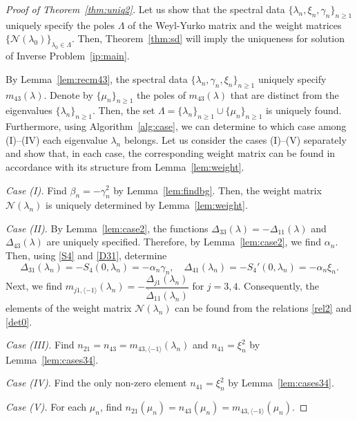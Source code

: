 \documentclass[a4paper,12pt]{article}
\newcommand{\al}{\alpha}
\newcommand{\be}{\beta}
\newcommand{\ga}{\gamma}
\newcommand{\la}{\lambda}
\theoremstyle{plain}
\numberwithin{equation}{section}
\theoremstyle{definition}
\theoremstyle{remark}
\begin{document}
\begin{proof}[Proof of Theorem~\ref{thm:uniq2}]
Let us show that the spectral data $\{ \la_n, \xi_n, \ga_n \}_{n \ge 1}$ uniquely specify the poles $\Lambda$ of the Weyl-Yurko matrix and the weight matrices $\{\mathcal N(\la_0) \}_{\la_0 \in \Lambda}$. Then, Theorem~\ref{thm:sd} will imply the uniqueness for solution of Inverse Problem~\ref{ip:main}.

By Lemma~\ref{lem:recm43}, the spectral data $\{ \la_n, \ga_n, \xi_n \}_{n \ge 1}$ uniquely specify $m_{43}(\la)$. Denote by $\{\mu_n \}_{n \ge 1}$ the poles of $m_{43}(\la)$ that are distinct from the eigenvalues $\{ \la_n \}_{n \ge 1}$. Then, the set $\Lambda = \{ \la_n \}_{n \ge 1} \cup \{ \mu_n \}_{n \ge 1}$ is uniquely found. Furthermore, using Algorithm~\ref{alg:case}, we can determine to which case among (I)--(IV) each eigenvalue $\la_n$ belongs. Let us consider the cases (I)--(V) separately and show that, in each case, the corresponding weight matrix can be found in accordance with its structure from Lemma~\ref{lem:weight}.

\smallskip

\textit{Case (I).} Find $\be_n =- \ga_n^2$ by Lemma~\ref{lem:findbg}. Then, the weight matrix $\mathcal N(\la_n)$ is uniquely determined by Lemma~\ref{lem:weight}.

\smallskip

\textit{Case (II).} By Lemma~\ref{lem:case2}, the functions $\Delta_{33}(\la) = -\Delta_{11}(\la)$ and $\Delta_{43}(\la)$ are uniquely specified. Therefore, by Lemma~\ref{lem:case2}, we find $\al_n$. Then, using \eqref{S4} and \eqref{D31}, determine 
$$
\Delta_{31}(\la_n) = -S_4(0, \la_n) = -\al_n \ga_n, \quad \Delta_{41}(\la_n) = -S_4'(0, \la_n) = -\al_n \xi_n. 
$$
Next, we find $m_{j1, \langle -1 \rangle}(\la_n) =-\dfrac{\Delta_{j1}(\la_n)}{\dot \Delta_{11}(\la_n)}$ for $j = 3, 4$. Consequently, the elements of the weight matrix $\mathcal N(\la_n)$ can be found from the relations \eqref{rel2} and \eqref{det0}.

\smallskip

\textit{Case (III).} Find $n_{21} = n_{43} = m_{43, \langle -1 \rangle}(\la_n)$ and $n_{41} = \xi_n^2$ by Lemma~\ref{lem:cases34}.

\smallskip

\textit{Case (IV).} Find the only non-zero element $n_{41} = \xi_n^2$ by Lemma~\ref{lem:cases34}.

\smallskip

\textit{Case (V).} For each $\mu_n$, find $n_{21}(\mu_n) = n_{43}(\mu_n) = m_{43,\langle -1\rangle}(\mu_n)$.
\end{proof}
\end{document}
